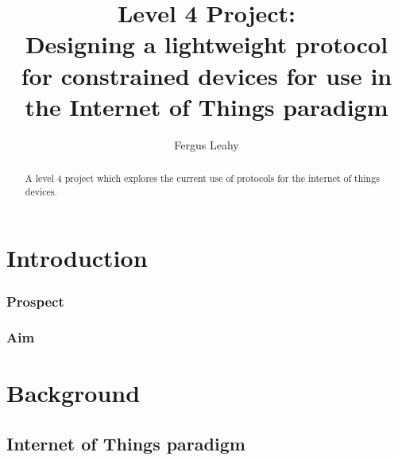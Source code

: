 \documentclass{l4proj}
\begin{document}
\title{Level 4 Project: \\
		Designing a lightweight protocol for constrained devices for use in the Internet of Things paradigm}
\author{Fergus Leahy}
\date{}
\maketitle

\begin{abstract}
A level 4 project which explores the current use of protocols for the internet of things devices.
\end{abstract}

\educationalconsent
%
%
\tableofcontents

\chapter{Introduction}

\subsection{Prospect} %
\label{sub:prospect}


\subsection{Aim} %
\label{sub:aim}




\chapter{Background} %
\label{cha:background}

\section{Internet of Things paradigm} %
\label{sec:internet_of_things_paradigm}

\end{document}
